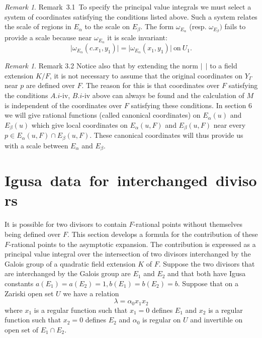 \documentclass{memo-l}
\theoremstyle{definition}
\theoremstyle{remark}
\newtheorem{remark}[theorem]{Remark}
\numberwithin{section}{chapter}
\numberwithin{equation}{chapter}
\begin{document}
\begin{remark}{Remark\  3.1}\ To specify the principal value integrals we must
select a system of coordinates satisfying the conditions listed above.
Such a system relates the scale of regions in $E_{{\alpha}}$ to the scale
on $E_{{\beta}}$.  The form ${\omega}_{E_\alpha}$ (resp. ${\omega}_{E_\beta} )$ fails to provide a scale because near
${\omega}_{E_\alpha}$ it is scale invariant:
$$
\vert {\omega}_{E_\alpha} (c.x_{1},y_{1})\vert  =  \vert {\omega}_{E_\alpha}
(x_{1},y_{1})\vert\ {\text{on}}\ U_{1}.
$$
\end{remark}

\begin{remark}{Remark 3.2} Notice also that by extending the norm $\vert\
\ 
\vert$ to a field extension $K/F$, it is not necessary to assume that the
original coordinates on $Y_{{\Gamma}}$ near $p$ are defined over $F$.  The
reason for this is that coordinates over $F$ satisfying the conditions
$A.i$-iv, $B.i$-iv above can always be found and the calculation of $M$ is
independent of the coordinates over $F$ satisfying these conditions.  In
section $6$ we will give rational functions (called canonical coordinates)
on $E_{{\alpha}}(u)$ and $E_{{\beta}}(u)$ which give local coordinates on
$E_{{\alpha}}(u,F)$ and $E_{\beta}(u,F)$ near every $p \in
E_{{\alpha}}(u,F) \cap E_{{\beta}}(u,F)$.  These canonical coordinates
will thus provide us with a scale between $E_{{\alpha}}$ and $E_{{\beta}}$.
\end{remark}

\section{Igusa\ data\ for\ interchanged\ divisors}

   It is possible for two divisors to contain $F$-rational points without
themselves being defined over $F$.  This section develops a formula for the
contribution of these $F$-rational points to the asymptotic expansion.  The
contribution is expressed as a principal value integral over the
intersection of two divisors interchanged by the Galois group of a
quadratic field extension $K$ of $F$.  Suppose the two divisors that are
interchanged by the Galois group are $E_{1}$ and $E_{2}$ and that both have
Igusa constants $a(E_{1}) = a(E_{2}) = 1, b(E_{1}) = b(E_{2}) = b$.
Suppose that on a Zariski open set $U$ we have a relation
$$
{\lambda} = {\alpha}_{0}x_{1}x_{2}
$$
where $x_{1}$ is a regular function such that $x_{1} = 0$ defines $E_{1}$
and $x_{2}$ is a regular function such that $x_{2} = 0$ defines $E_{2}$ and
${\alpha}_{0}$ is regular on $U$ and invertible on open set of $E_{1}
\cap E_{2}$.
 
\end{document}
